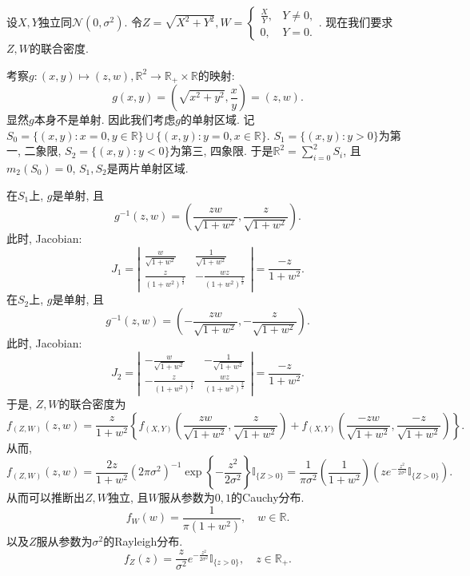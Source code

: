 \documentclass[UTF8, a4paper]{article}
\begin{document}
\begin{framed}
设\(X, Y\)独立同\(\mathcal{N}(0, \sigma^2)\). 令\(Z = \sqrt{X^2+ Y^2}, W = \begin{cases}
    \frac{X}{Y}, & Y \neq 0, \\
    0, & Y = 0.
\end{cases}\). 现在我们要求\(Z, W\)的联合密度.

考察\(g:(x,y) \mapsto (z,w), \mathbb{R}^2 \to \mathbb{R}_+ \times \mathbb{R}\)的映射:
$$
g(x,y) = \left(\sqrt{x^2 + y^2}, \frac{x}{y}\right) = (z, w).
$$
显然\(g\)本身不是单射. 因此我们考虑\(g\)的单射区域.  
记\(S_0 = \{(x,y): x = 0, y\in \mathbb{R}\} \cup \{(x,y): y = 0, x\in \mathbb{R}\}\).
\(S_1 = \{(x, y): y > 0\}\)为第一, 二象限, \(S_2 = \{(x, y): y < 0\}\)为第三, 四象限.
于是\(\mathbb{R}^2 = \sum_{i=0}^{2}S_i\), 且\(m_2(S_0) = 0\), \(S_1, S_2\)是两片单射区域.

在\(S_1\)上, \(g\)是单射, 且$$
g^{-1}(z,w) = \left(\frac{zw}{\sqrt{1+w^2}}, \frac{z}{\sqrt{1+w^2}}\right).
$$
此时, Jacobian:
$$
J_1 = \left|\begin{matrix}
    \frac{w}{\sqrt{1+w^2}} & \frac{1}{\sqrt{1+w^2}} \\
    \frac{z}{{(1+w^2)^{\frac{3}{2}}}} & -\frac{wz}{(1+w^2)^{\frac{3}{2}}}
\end{matrix}\right| = \frac{-z}{1+w^2}.
$$
在\(S_2\)上, \(g\)是单射, 且$$
g^{-1}(z,w) = \left(-\frac{zw}{\sqrt{1+w^2}}, -\frac{z}{\sqrt{1+w^2}}\right).
$$
此时, Jacobian:
$$
J_2 = \left|\begin{matrix}
    -\frac{w}{\sqrt{1+w^2}} & -\frac{1}{\sqrt{1+w^2}} \\
    -\frac{z}{{(1+w^2)^{\frac{3}{2}}}} & \frac{wz}{(1+w^2)^{\frac{3}{2}}}
\end{matrix}\right| = \frac{-z}{1+w^2}.
$$
于是, \(Z, W\)的联合密度为
$$
f_{(Z,W)}(z,w) = \frac{z}{1+w^2}\left\{f_{(X,Y)}\left(\frac{zw}{\sqrt{1+w^2}}, \frac{z}{\sqrt{1+w^2}}\right) + f_{(X,Y)}\left(\frac{-zw}{\sqrt{1+w^2}}, \frac{-z}{\sqrt{1+w^2}}\right)\right\}.
$$
从而, 
$$
f_{(Z,W)}(z,w) = \frac{2z}{1+w^2} (2\pi\sigma^2)^{-1} \exp\left\{-\frac{z^2}{2\sigma^2}\right\} \mathbb{I}_{\{Z >0\}} = \frac{1}{\pi \sigma^2}\left(\frac{1}{1+w^2}\right)\left(z e^{-\frac{z^2}{2\sigma^2}} \mathbb{I}_{\{Z > 0\}}\right).
$$
从而可以推断出\(Z,W\)独立, 且\(W\)服从参数为\(0, 1\)的Cauchy分布.
$$
f_W(w) = \frac{1}{\pi(1+w^2)}, \quad w \in \mathbb{R}.
$$
以及\(Z\)服从参数为\(\sigma^2\)的Rayleigh分布. 
$$
f_Z(z) = \frac{z}{\sigma^2} e^{-\frac{z^2}{2\sigma^2}} \mathbb{I}_{\{z > 0\}}, \quad z \in \mathbb{R}_+.
$$
\end{framed}
\end{document}
